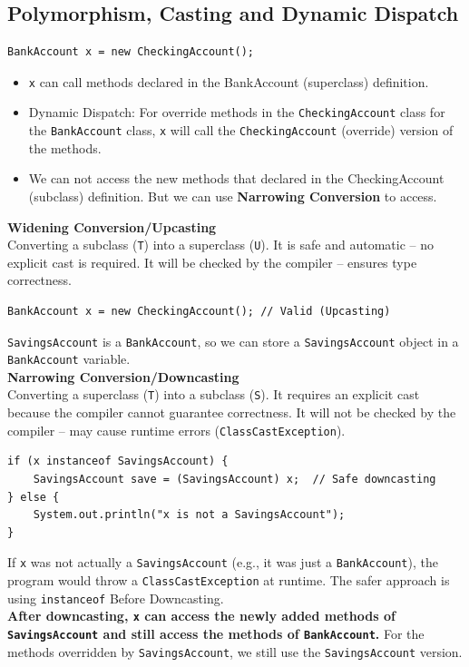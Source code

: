 \documentclass[letterpaper,12pt]{article}
\begin{document}
\subsection{Polymorphism, Casting and Dynamic Dispatch}
\begin{verbatim}
BankAccount x = new CheckingAccount();
\end{verbatim}
\begin{itemize}
    \item \texttt{x} can call methods declared in the BankAccount (superclass) definition.
    \item Dynamic Dispatch: For override methods in the \texttt{CheckingAccount} class for the \texttt{BankAccount} class, \texttt{x} will call the \texttt{CheckingAccount} (override) version of the methods.
    \item We can not access the new methods that declared in the CheckingAccount (subclass) definition. But we can use \textbf{Narrowing Conversion} to access.
\end{itemize}
\textbf{Widening Conversion/Upcasting}\\
Converting a subclass (\texttt{T}) into a superclass (\texttt{U}). It is safe and automatic – no explicit cast is required. It will be checked by the compiler – ensures type correctness.
\begin{verbatim}
BankAccount x = new CheckingAccount(); // Valid (Upcasting)
\end{verbatim}
\texttt{SavingsAccount} is a \texttt{BankAccount}, so we can store a \texttt{SavingsAccount} object in a \texttt{BankAccount} variable.\\
\textbf{Narrowing Conversion/Downcasting}\\
Converting a superclass (\texttt{T}) into a subclass (\texttt{S}). It requires an explicit cast because the compiler cannot guarantee correctness. It will not be checked by the compiler – may cause runtime errors (\texttt{ClassCastException}).
\begin{verbatim}
if (x instanceof SavingsAccount) {
    SavingsAccount save = (SavingsAccount) x;  // Safe downcasting
} else {
    System.out.println("x is not a SavingsAccount");
}
\end{verbatim}
If \texttt{x} was not actually a \texttt{SavingsAccount} (e.g., it was just a \texttt{BankAccount}), the program would throw a \texttt{ClassCastException} at runtime. The safer approach is using \texttt{instanceof} Before Downcasting.\\
\textbf{After downcasting, \texttt{x} can access the newly added methods of \texttt{SavingsAccount} and still access the methods of \texttt{BankAccount}.} For the methods overridden by \texttt{SavingsAccount}, we still use the \texttt{SavingsAccount} version.
\end{document}
